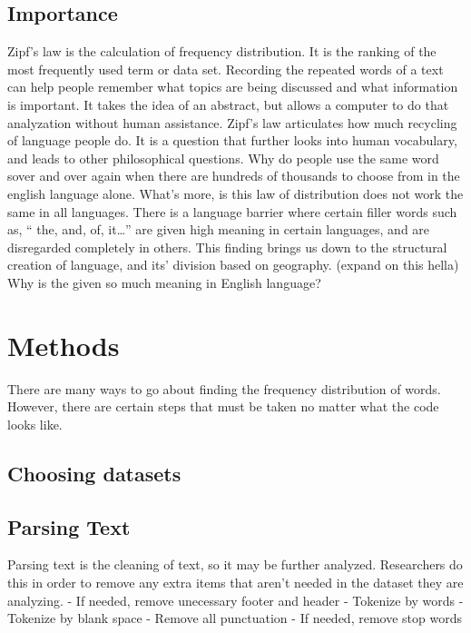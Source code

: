 \documentclass[a4paper,10pt]{article}
\newcounter{code}[section]
\begin{document}
\subsection{Importance}

Zipf’s law is the calculation of frequency distribution. It is the ranking of the most frequently used term or data set. Recording the repeated words of a text can help people remember what topics are being discussed and what information is important. It takes the idea of an abstract, but allows a computer to do that analyzation without human assistance.
Zipf’s law articulates how much recycling of language people do. It is a question that further looks into human vocabulary, and leads to other philosophical questions. Why do people use the same word sover and over again when there are hundreds of thousands to choose from in the english language alone. What’s more, is this law of distribution does not work the same in all languages. There is a language barrier where certain filler words such as, “ the, and, of, it…” are given high meaning in certain languages, and are disregarded completely in others. This finding brings us down to the structural  creation of language, and its’ division based on geography. (expand on this hella) Why is the given so much meaning in English language?



\section{Methods}

There are many ways to go about finding the frequency distribution of words. However, there are certain steps that must be taken no matter what the code looks like. 

\subsection{Choosing datasets}


\subsection{Parsing Text}

Parsing text is the cleaning of text, so it may be further analyzed. Researchers do this in order to remove any extra items that aren’t needed in the dataset they are analyzing. 
-  If needed, remove unecessary footer and header
- Tokenize by words
- Tokenize by blank space
- Remove all punctuation
- If needed, remove stop words
\end{document}

